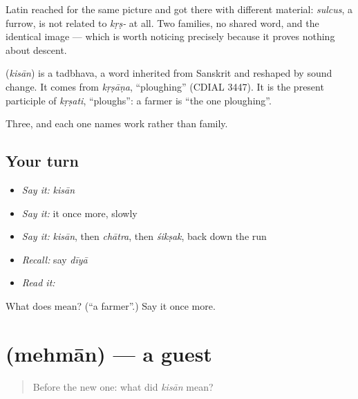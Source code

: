 Latin reached for the same picture and got there with different material: \emph{sulcus}, a furrow, is not related to \emph{kṛṣ-} at all. Two families, no shared word, and the identical image — which is worth noticing precisely because it proves nothing about descent.

\begin{cousinweb}
\textbf{} (\emph{kisān}) is a tadbhava, a word inherited from Sanskrit and reshaped by sound change. It comes from \emph{kṛṣāṇa}, \textquotedblleft{}ploughing\textquotedblright{} (CDIAL 3447). It is the present participle of \emph{kṛṣati}, \textquotedblleft{}ploughs\textquotedblright{}: a farmer is \textquotedblleft{}the one ploughing\textquotedblright{}.
\end{cousinweb}

\begin{grammarlens}[title={What you've built}]
Three, and each one names work rather than family.
\end{grammarlens}

\subsection*{Your turn}
\begin{itemize}
\raggedright
  \item \emph{Say it:} \emph{kisān}
  \item \emph{Say it:} it once more, slowly
  \item \emph{Say it:} \emph{kisān}, then \emph{chātra}, then \emph{śikṣak}, back down the run
  \item \emph{Recall:} say \emph{dīyā}
  \item \emph{Read it:} \textbf{}
\end{itemize}

\begin{tcolorbox}[breakable,colback=teal!4,colframe=teal!35!black,title={Before you move on}]
What does  mean? (\textquotedblleft{}a farmer\textquotedblright{}.) Say it once more.
\end{tcolorbox}
\section[\texorpdfstring{\hi{मेहमान} (mehmān)}{मेहमान (mehmān)}]{ (mehmān) — a guest}

\label{lesson:HI-C47-guest}



\begin{quote}
Before the new one: what did \emph{kisān} mean?
\end{quote}

